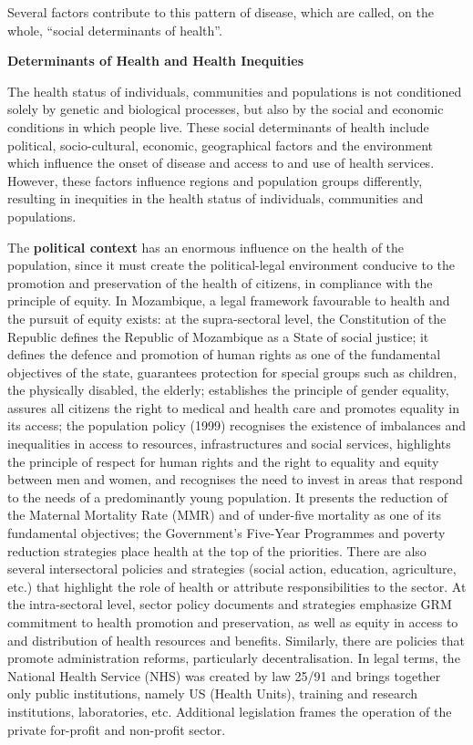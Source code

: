 \documentclass[
]{book}
\begin{document}
Several factors contribute to this pattern of disease, which are called, on the whole, ``social determinants of health''.

\textbf{Determinants of Health and Health Inequities}

The health status of individuals, communities and populations is not conditioned solely by genetic and biological processes, but also by the social and economic conditions in which people live. These social determinants of health include political, socio-cultural, economic, geographical factors and the environment which influence the onset of disease and access to and use of health services. However, these factors influence regions and population groups differently, resulting in inequities in the health status of individuals, communities and populations.

The \textbf{political context} has an enormous influence on the health of the population, since it must create the political-legal environment conducive to the promotion and preservation of the health of citizens, in compliance with the principle of equity. In Mozambique, a legal framework favourable to health and the pursuit of equity exists: at the supra-sectoral level, the Constitution of the Republic defines the Republic of Mozambique as a State of social justice; it defines the defence and promotion of human rights as one of the fundamental objectives of the state, guarantees protection for special groups such as children, the physically disabled, the elderly; establishes the principle of gender equality, assures all citizens the right to medical and health care and promotes equality in its access; the population policy (1999) recognises the existence of imbalances and inequalities in access to resources, infrastructures and social services, highlights the principle of respect for human rights and the right to equality and equity between men and women, and recognises the need to invest in areas that respond to the needs of a predominantly young population. It presents the reduction of the Maternal Mortality Rate (MMR) and of under-five mortality as one of its fundamental objectives; the Government's Five-Year Programmes and poverty reduction strategies place health at the top of the priorities. There are also several intersectoral policies and strategies (social action, education, agriculture, etc.) that highlight the role of health or attribute responsibilities to the sector. At the intra-sectoral level, sector policy documents and strategies emphasize GRM commitment to health promotion and preservation, as well as equity in access to and distribution of health resources and benefits. Similarly, there are policies that promote administration reforms, particularly decentralisation. In legal terms, the National Health Service (NHS) was created by law 25/91 and brings together only public institutions, namely US (Health Units), training and research institutions, laboratories, etc. Additional legislation frames the operation of the private for-profit and non-profit sector.
\end{document}
